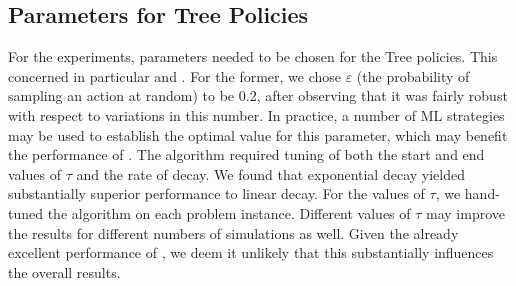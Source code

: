 \subsection{Parameters for Tree Policies}
For the experiments, parameters needed to be chosen for the Tree policies. This concerned in particular \egreedy and \soft. For the former, we chose $\varepsilon$ (the probability of sampling an action at random) to be 0.2, after observing that it was fairly robust with respect to variations in this number. In practice, a number of ML strategies may be used to establish the optimal value for this parameter, which may benefit the performance of \egreedy. The \soft algorithm required tuning of both the start and end values of $\tau$ and the rate of decay. We found that exponential decay yielded substantially superior performance to linear decay. For the values of $\tau$, we hand-tuned the algorithm on each problem instance. Different values of $\tau$ may improve the results for different numbers of simulations as well. Given the already excellent performance of \soft, we deem it unlikely that this substantially influences the overall results.